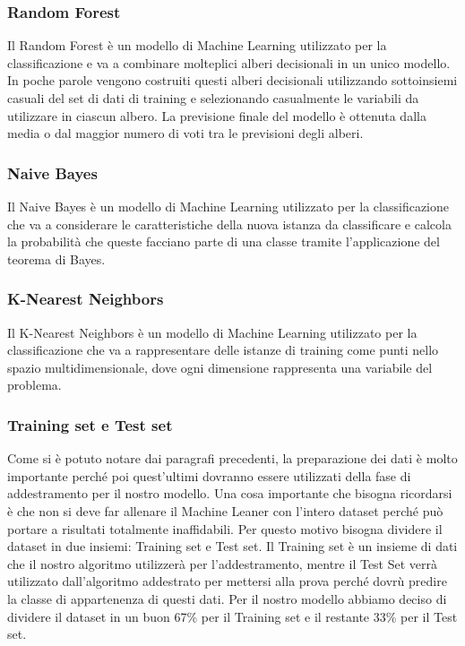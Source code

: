\documentclass[12pt]{article}
\begin{document}
\subsubsection{Random Forest}
Il Random Forest è un modello di Machine Learning utilizzato per la classificazione e va a combinare molteplici alberi decisionali in un unico modello. In poche parole vengono costruiti questi alberi
decisionali utilizzando sottoinsiemi casuali del set di dati di training e selezionando casualmente le variabili da utilizzare in ciascun albero. La previsione finale del modello è ottenuta dalla media o dal maggior numero di voti tra le previsioni degli alberi.

\subsubsection{Naive Bayes}
Il Naive Bayes è un modello di Machine Learning utilizzato per la classificazione che va a considerare le caratteristiche della nuova istanza da classificare e calcola la probabilità che queste facciano parte di una classe
tramite l'applicazione del teorema di Bayes.

\subsubsection{K-Nearest Neighbors}
Il K-Nearest Neighbors è un modello di Machine Learning utilizzato per la classificazione che va a rappresentare delle istanze di training come punti nello spazio multidimensionale, dove ogni dimensione
rappresenta una variabile del problema.

\subsubsection{Training set e Test set}
Come si è potuto notare dai paragrafi precedenti, la preparazione dei dati è molto importante perché poi quest'ultimi dovranno essere utilizzati della fase di addestramento per il nostro modello. Una cosa importante che bisogna ricordarsi è che non si deve far allenare il Machine Leaner con
l'intero dataset perché può portare a risultati totalmente inaffidabili. Per questo motivo bisogna dividere il dataset  in due insiemi: Training set e Test set. Il Training set è un insieme di dati che il nostro algoritmo utilizzerà per l'addestramento, mentre il Test Set verrà utilizzato dall'algoritmo
addestrato per mettersi alla prova perché dovrù predire la classe di appartenenza di questi dati.
Per il nostro modello abbiamo deciso di dividere il dataset in un buon 67\% per il Training set e il restante 33\% per il Test set.
\end{document}
